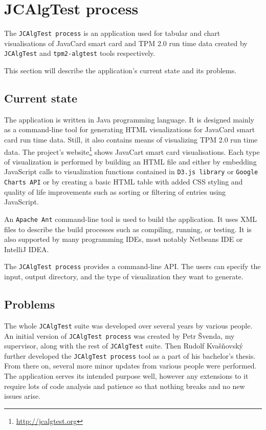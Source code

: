 \section{JCAlgTest process}
The \texttt{JCAlgTest process} is an application used for tabular and chart visualisations of JavaCard smart card and TPM 2.0 run time data created by \texttt{JCAlgTest} and \texttt{tpm2-algtest} tools respectively. 

This section will describe the application's current state and its problems.
\subsection{Current state}
The application is written in Java programming language. It is designed mainly as a command-line tool for generating HTML visualizations for JavaCard smart card run time data. Still, it also contains means of visualizing TPM 2.0 run time data. The project's website\footnote{\url{http://jcalgtest.org}} shows JavaCart smart card visualisations. Each type of visualization is performed by building an HTML file and either by embedding JavaScript calls to visualization functions contained in  \texttt{D3.js library} or \texttt{Google Charts API} or by creating a basic HTML table with added CSS styling and quality of life improvements such as sorting or filtering of entries using JavaScript. 

An \texttt{Apache Ant} command-line tool is used to build the application. It uses XML files to describe the build processes such as compiling, running, or testing. It is also supported by many programming IDEs, most notably Netbeans IDE or IntelliJ IDEA.

The \texttt{JCAlgTest process} provides a command-line API. The users can specify the input, output directory, and the type of visualization they want to generate.

\subsection{Problems}\label{subsec:design-problems}
The whole \texttt{JCAlgTest} suite was developed over several years by various people. An initial version of \texttt{JCAlgTest process} was created by Petr Švenda, my supervisor, along with the rest of \texttt{JCAlgTest} suite. Then Rudolf Kvašňovský further developed the \texttt{JCAlgTest process} tool as a part of his bachelor's thesis. From there on, several more minor updates from various people were performed. The application serves its intended purpose well, however any extensions to it require lots of code analysis and patience so that nothing breaks and no new issues arise.

